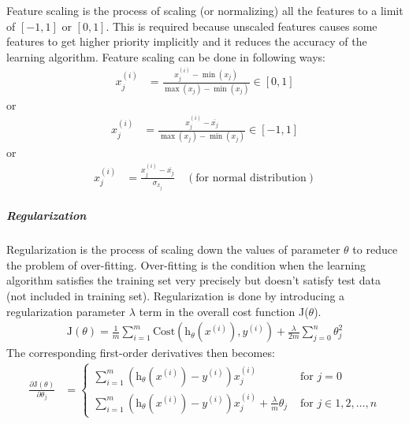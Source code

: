 Feature scaling is the process of scaling (or normalizing) all the features
to a limit of $[-1,1]$ or $[0,1]$. This is required because unscaled features
causes some features to get higher priority implicitly and it reduces
the accuracy of the learning algorithm. Feature scaling can be done in following
ways:
\begin{align}
  x_j^{(i)} &= \frac{x_j^{(i)} - \min (x_j)}{ \max (x_j) - \min (x_j)}
  \in [0, 1]
  \nonumber
\end{align}
or
\begin{align}
  x_j^{(i)} &= \frac{x_j^{(i)} - \overline{x_j}}{ \max (x_j) - \min (x_j)}
  \in [-1, 1]
  \nonumber
\end{align}
or
\begin{align}
  x_j^{(i)} &= \frac{x_j^{(i)} - \overline{x_j}}{\sigma_{x_j}}
  \quad (\text{for normal distribution})
  \nonumber
\end{align}


\subparagraph{Regularization}\hfill


Regularization \cite{jason} is the process of scaling down the values of parameter $\theta$
to reduce the problem of over-fitting. Over-fitting is the condition when
the learning algorithm satisfies the training set very precisely but doesn't
satisfy test data (not included in training set). Regularization is done
by introducing a regularization parameter $\lambda$ term in the overall
cost function J($\theta$).
\begin{align}
  \text{J}(\theta) = \frac{1}{m} \sum_{i=1}^{m}
  \text{Cost} \left( \text{h}_\theta \left(x^{(i)} \right), y^{(i)} \right)
  + \frac{\lambda}{2m} \sum_{j=0}^n \theta_j^2
  \label{eqn:j-with-l}
\end{align}
The corresponding first-order derivatives then becomes:
\begin{align}
  \frac{\partial \text{J}(\theta)}{\partial \theta_j} &=
  \begin{cases}
    \displaystyle
    \sum_{i=1}^{m} \left( \text{h}_\theta \left(x^{(i)}\right) - y^{(i)} \right) x^{(i)}_j
    &\text{ for } j = 0\\
    \displaystyle
    \sum_{i=1}^{m} \left( \text{h}_\theta \left(x^{(i)}\right) - y^{(i)} \right) x^{(i)}_j
    + \frac{\lambda}{m} \theta_j
    &\text{ for } j \in {1,2,\ldots,n}
  \end{cases}
  \nonumber
\end{align}
